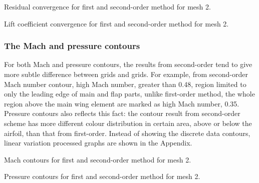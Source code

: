 \documentclass[letterpaper,onecolumn,12pt]{article}
\makeatletter
\newenvironment{figurehere}
  {\def\@captype{figure}}{}
\makeatother
\begin{document}
\begin{figurehere}
 \centering 
  \hspace{.05cm} 
  \caption{Residual convergence for first and second-order method for mesh 2.} 
\end{figurehere}

\begin{figurehere}
 \centering 
  \hspace{.05cm} 
  \caption{Lift coefficient convergence for first and second-order method for mesh 2.} 
\end{figurehere}

\subsubsection{The Mach and pressure contours}
For both Mach and pressure contours, the results from second-order tend to give more subtle difference between grids and grids. For example, from second-order Mach number contour, high Mach number, greater than 0.48, region limited to only the leading edge of main and flap parts, unlike first-order method, the whole region above the main wing element are marked as high Mach number, 0.35. Pressure contours also reflects this fact: the contour result from second-order scheme has more different colour distribution in certain area, above or below the airfoil, than that from first-order. Instead of showing the discrete data contours, linear variation processed graphs are shown in the Appendix.

\begin{figurehere}
 \centering 
  \hspace{.05cm} 
  \caption{Mach contours for first and second-order method for mesh 2.} 
\end{figurehere}

\begin{figurehere}
 \centering 
  \hspace{.05cm} 
  \caption{Pressure contours for first and second-order method for mesh 2.} 
\end{figurehere}
\end{document}
